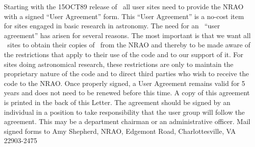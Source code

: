    Starting with the 15OCT89 release of \AIPS\ all user sites
need to provide the NRAO with a signed ``User Agreement'' form.  This
``User Agreement'' is a no-cost item for sites engaged in basic
research in astronomy.  The need for an \AIPS\ ``user agreement'' has
arisen for several reasons.  The most important is that we want all
\AIPS\ sites to obtain their copies of \AIPS\ from the NRAO and
thereby to be made aware of the restrictions that apply to their use
of the code and to our support of it.  For sites doing astronomical
research, these restrictions are only to maintain the proprietary
nature of the code and to direct third parties who wish to receive the
code to the \hbox{NRAO}.  Once properly signed, a User Agreement
remains valid for 5 years and does not need to be renewed before this
time.  A copy of this agreement is printed in the back of this
\AIPS Letter.  The agreement should be signed by an individual in a
position to take responsibility that the user group will follow the
agreement.  This may be a department chairman or an administrative
officer.  Mail signed forms to Amy Shepherd, NRAO, Edgemont Road,
Charlottesville, VA 22903-2475


